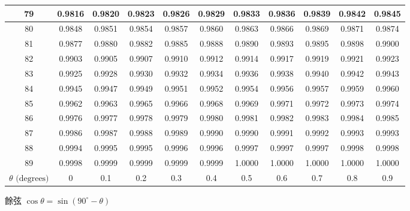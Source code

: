 {\begin{tabular}{|c|cccccccccc|}
79 & 0.9816 & 0.9820 & 0.9823 & 0.9826 & 0.9829 & 0.9833 & 0.9836 & 0.9839 & 0.9842 & 0.9845 \\
\hline
80 & 0.9848 & 0.9851 & 0.9854 & 0.9857 & 0.9860 & 0.9863 & 0.9866 & 0.9869 & 0.9871 & 0.9874 \\
81 & 0.9877 & 0.9880 & 0.9882 & 0.9885 & 0.9888 & 0.9890 & 0.9893 & 0.9895 & 0.9898 & 0.9900 \\
82 & 0.9903 & 0.9905 & 0.9907 & 0.9910 & 0.9912 & 0.9914 & 0.9917 & 0.9919 & 0.9921 & 0.9923 \\
83 & 0.9925 & 0.9928 & 0.9930 & 0.9932 & 0.9934 & 0.9936 & 0.9938 & 0.9940 & 0.9942 & 0.9943 \\
84 & 0.9945 & 0.9947 & 0.9949 & 0.9951 & 0.9952 & 0.9954 & 0.9956 & 0.9957 & 0.9959 & 0.9960 \\
\hline
85 & 0.9962 & 0.9963 & 0.9965 & 0.9966 & 0.9968 & 0.9969 & 0.9971 & 0.9972 & 0.9973 & 0.9974 \\
86 & 0.9976 & 0.9977 & 0.9978 & 0.9979 & 0.9980 & 0.9981 & 0.9982 & 0.9983 & 0.9984 & 0.9985 \\
87 & 0.9986 & 0.9987 & 0.9988 & 0.9989 & 0.9990 & 0.9990 & 0.9991 & 0.9992 & 0.9993 & 0.9993 \\
88 & 0.9994 & 0.9995 & 0.9995 & 0.9996 & 0.9996 & 0.9997 & 0.9997 & 0.9997 & 0.9998 & 0.9998 \\
89 & 0.9998 & 0.9999 & 0.9999 & 0.9999 & 0.9999 & 1.0000 & 1.0000 & 1.0000 & 1.0000 & 1.0000 \\
\hline
$\theta\text{ (degrees)}$ & 0 & 0.1 & 0.2 & 0.3 & 0.4 & 0.5 & 0.6 & 0.7 & 0.8 & 0.9 \\ \hline
\end{tabular}\par}
\vspace{0.5em}\begin{center}\small 餘弦 $\cos\theta = \sin(90^\circ - \theta)$\end{center}
\clearpage

